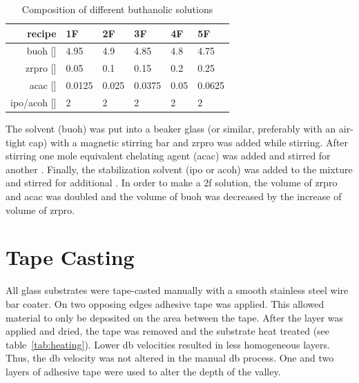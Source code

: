 \begin{table}[h]
	\centering
	\caption{Composition of different buthanolic solutions}
	\label{tab:rec2}
	\begin{tabular}{rlllll}
		\hline
		recipe	&1F		&2F		&3F		&4F		&5F		\\
		\hline
		\gls{buoh} [\ml{}]		&4.95	&4.9	&4.85	&4.8	&4.75	\\
		\gls{zrpro} [\ml{}]	&0.05	&0.1	&0.15	&0.2	&0.25	\\
		\gls{acac} [\ml{}]		&0.0125	&0.025	&0.0375	&0.05	&0.0625	\\
		\gls{ipo}/\gls{acoh} [\ml{}]		&2		&2		&2		&2		&2		\\
		\hline
	\end{tabular}
\end{table}

The solvent (\gls{buoh}) was put into a beaker glass (or similar, preferably with an 
air-tight cap) with a magnetic stirring bar and \gls{zrpro} was added while stirring. After 
stirring  one mole equivalent chelating agent (\gls{acac}) was 
added and stirred for another . Finally, the stabilization 
solvent\cite{Hu2016} (\gls{ipo} or \gls{acoh}) was added to the mixture and stirred for 
additional . 
In order to make a \gls{2f} solution, the volume of \gls{zrpro} and \gls{acac} was 
doubled and the volume of \gls{buoh} was decreased by the increase of volume of \gls{zrpro}. 

\section{Tape Casting}
\label{sec:exp-db}
All glass substrates were tape-casted manually with a smooth stainless steel wire bar coater. 
On two opposing edges adhesive tape was applied. %
This allowed material to only be deposited on the area between the tape.
After the layer was applied and dried, the tape was removed and the substrate heat treated (see table~\ref{tab:heating}).
Lower \gls{db} velocities resulted in less homogeneous layers.
Thus, the \gls{db} velocity was not altered in the manual \gls{db} process. 
One and two layers of adhesive tape were used to alter the depth of the valley. 

